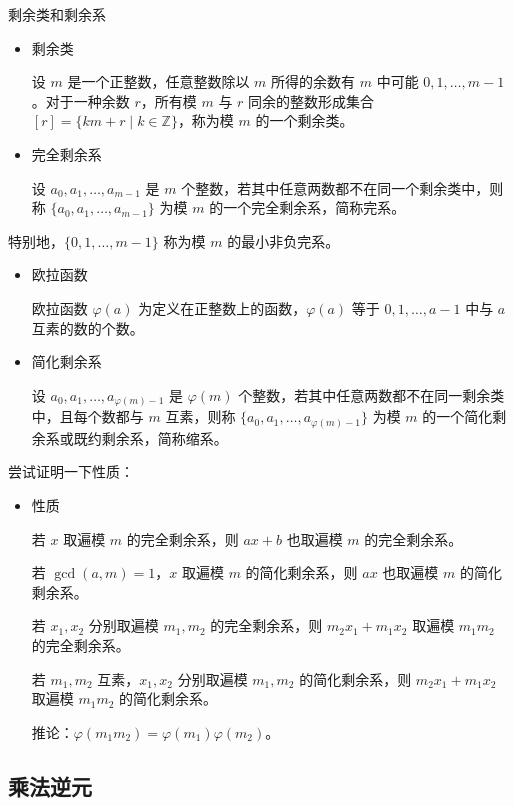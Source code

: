 \documentclass [hyperref={bookmarksdepth=4}, aspectratio=169] {beamer}
\theoremstyle {fy}
\def\Z{\mathbb{Z}}
\begin{document}
\begin{frame}{剩余类和剩余系}
\begin{itemize}
    \item 剩余类

  设 $m$ 是一个正整数，任意整数除以 $m$ 所得的余数有 $m$ 中可能 $0,1,\dots,m-1$。对于一种余数 $r$，所有模 $m$ 与 $r$ 同余的整数形成集合 $[r]=\{km+r\mid k\in\Z\}$，称为模 $m$ 的一个剩余类。

    \item 完全剩余系

  设 $a_0,a_1,\dots,a_{m-1}$ 是 $m$ 个整数，若其中任意两数都不在同一个剩余类中，则称 $\{a_0,a_1,\dots,a_{m-1}\}$  为模 $m$ 的一个完全剩余系，简称完系。
\end{itemize}

特别地，$\{0,1,\dots,m-1\}$ 称为模 $m$ 的最小非负完系。

\begin{itemize}
    \item 欧拉函数

  欧拉函数 $\varphi(a)$ 为定义在正整数上的函数，$\varphi(a)$ 等于 $0,1,\dots,a-1$ 中与 $a$ 互素的数的个数。

    \item 简化剩余系

  设 $a_0,a_1,\dots,a_{\varphi(m)-1}$ 是 $\varphi(m)$ 个整数，若其中任意两数都不在同一剩余类中，且每个数都与 $m$ 互素，则称 $\{a_0,a_1,\dots,a_{\varphi(m)-1}\}$ 为模 $m$ 的一个简化剩余系或既约剩余系，简称缩系。
\end{itemize}

尝试证明一下性质：

\begin{itemize}
    \item 性质

  若 $x$ 取遍模 $m$ 的完全剩余系，则 $ax+b$ 也取遍模 $m$ 的完全剩余系。

  若 $\gcd(a,m)=1$，$x$ 取遍模 $m$ 的简化剩余系，则 $ax$ 也取遍模 $m$ 的简化剩余系。

  若 $x_1,x_2$ 分别取遍模 $m_1,m_2$ 的完全剩余系，则 $m_2x_1+m_1x_2$ 取遍模 $m_1m_2$ 的完全剩余系。

  若 $m_1,m_2$ 互素，$x_1,x_2$ 分别取遍模 $m_1,m_2$ 的简化剩余系，则 $m_2x_1+m_1x_2$ 取遍模 $m_1m_2$ 的简化剩余系。

  推论：$\varphi(m_1m_2)=\varphi(m_1)\varphi(m_2)$。
\end{itemize}
\end{frame}

\subsection{乘法逆元}
\end{document}
